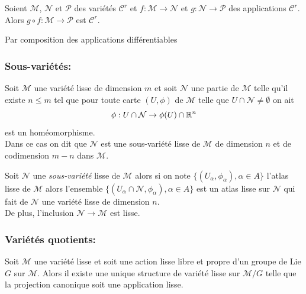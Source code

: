 \documentclass[12pt, a4paper]{book}
\begin{document}
\begin{pro}
Soient $\mathcal{M}$, $\mathcal{N}$ et $\mathcal{P}$ des variétés $\mathscr{C}^r$ et $f:\mathcal{M}\to \mathcal{N}$ et $g:\mathcal{N}\to\mathcal{P}$ des applications $\mathscr{C}^r$. Alors $g \circ f: \mathcal{M} \to \mathcal{P}$ est $\mathscr{C}^r$.
\end{pro}
\begin{preu}
Par composition des applications différentiables
\end{preu}

\subsubsection{Sous-variétés:}

\begin{defi}
Soit $\mathcal{M}$ une variété lisse de dimension $m$ et soit $\mathcal{N}$ une partie de $\mathcal{M}$ telle qu'il existe $n\leq m$ tel que pour toute carte $(U, \phi)$ de $\mathcal{M}$ telle que $U \cap \mathcal{N} \neq \emptyset$ on ait
$$\phi : U\cap \mathcal{N} \to \phi(U)\cap \mathbb{R}^n$$
est un homéomorphisme.\\
Dans ce cas on dit que $\mathcal{N}$ est une sous-variété lisse de $\mathcal{M}$ de dimension $n$ et de codimension $m-n$ dans $\mathcal{M}$.
\end{defi}

\begin{pro}
Soit $\mathcal{N}$ une \emph{sous-variété} lisse de $\mathcal{M}$ alors si on note $\{(U_\alpha, \phi_\alpha), \alpha \in A\}$ l'atlas lisse de $\mathcal{M}$ alors l'ensemble $\{(U_\alpha \cap \mathcal{N}, \phi_\alpha), \alpha \in A\}$ est un atlas lisse sur $\mathcal{N}$ qui fait de $\mathcal{N}$ une variété lisse de dimension $n$. \\
De plus, l'inclusion $\mathcal{N} \to \mathcal{M}$ est lisse.
\end{pro}

\subsubsection{Variétés quotients:}

\begin{defi}
Soit $\mathcal{M}$ une variété lisse et soit une action lisse libre et propre d'un groupe de Lie $G$ sur $\mathcal{M}$. Alors il existe une unique structure de variété lisse sur $\mathcal{M}/G$ telle que la projection canonique soit une application lisse.
\end{defi}
\end{document}
